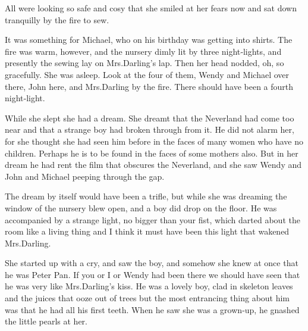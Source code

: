 All were looking so safe and cosy that she smiled at her fears now and sat down tranquilly by the fire to sew.

It was something for Michael, who on his birthday was getting into shirts.
The fire was warm, however, and the nursery dimly lit by three night‐lights,
and presently the sewing lay on Mrs.\@ Darling’s lap.
Then her head nodded, oh, so gracefully.
She was asleep.
Look at the four of them, Wendy and Michael over there, John here, and Mrs.\@ Darling by the fire.
There should have been a fourth night‐light.

While she slept she had a dream.
She dreamt that the Neverland had come too near and that a strange boy had broken through from it.
He did not alarm her, for she thought she had seen him before in the faces of many women who have no children.
Perhaps he is to be found in the faces of some mothers also.
But in her dream he had rent the film that obscures the Neverland,
and she saw Wendy and John and Michael peeping through the gap.

The dream by itself would have been a trifle,
but while she was dreaming the window of the nursery blew open, and a boy did drop on the floor.
He was accompanied by a strange light, no bigger than your fist,
which darted about the room like a living thing
and I think it must have been this light that wakened Mrs.\@ Darling.

She started up with a cry, and saw the boy,
and somehow she knew at once that he was Peter Pan.
If you or I or Wendy had been there we should have seen that he was very like Mrs.\@ Darling’s kiss.
He was a lovely boy,
clad in skeleton leaves and the juices that ooze out of trees
but the most entrancing thing about him was that he had all his first teeth.
When he saw she was a grown‐up, he gnashed the little pearls at her.

\endinput
